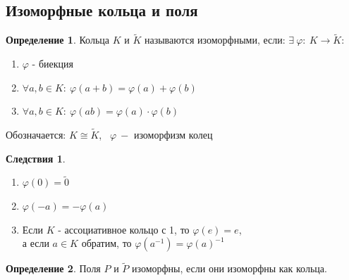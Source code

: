 \documentclass[a4paper, 12pt]{article}
\renewcommand{\phi}{\varphi}
\newcommand\tab[1][.5cm]{\hspace*{#1}}
\theoremstyle{definition}
\newtheorem*{definition}{Определение}
\newtheorem*{consequenses}{Следствия}
\begin{document}
  \subsection{Изоморфные кольца и поля}
  \begin{definition}
    Кольца $K$ и $\widetilde{K}$ называются изоморфными, если: 
    $\exists \ \phi: \ K \to \widetilde{K}:$
    \begin{enumerate}
      \item $\phi$ - биекция
      \item $\forall a, b \in K: \ \phi(a+b) = \phi(a)+\phi(b)$
      \item $\forall a, b \in K: \ \phi(ab) = \phi(a)\cdot \phi(b)$ 
    \end{enumerate}
    Обозначается: $K\cong \widetilde{K}$, \ $\phi \ - $ изоморфизм колец 
  \end{definition} 
  \begin{consequenses}\tab
    \begin{enumerate}
      \item $\phi(0) = \widetilde{0}$
      \item $\phi(-a) = -\phi(a)$
      \item Если $K$ - ассоциативное кольцо с 1, то $\phi(e) = e$, \\а если $a \in K$ обратим, то $\phi(a^{-1}) = \phi(a)^{-1}$
    \end{enumerate}
  \end{consequenses} 
  \begin{definition}
    Поля $P$ и $\widetilde{P}$  изоморфны, если они изоморфны как кольца.
  \end{definition} 
\end{document}
